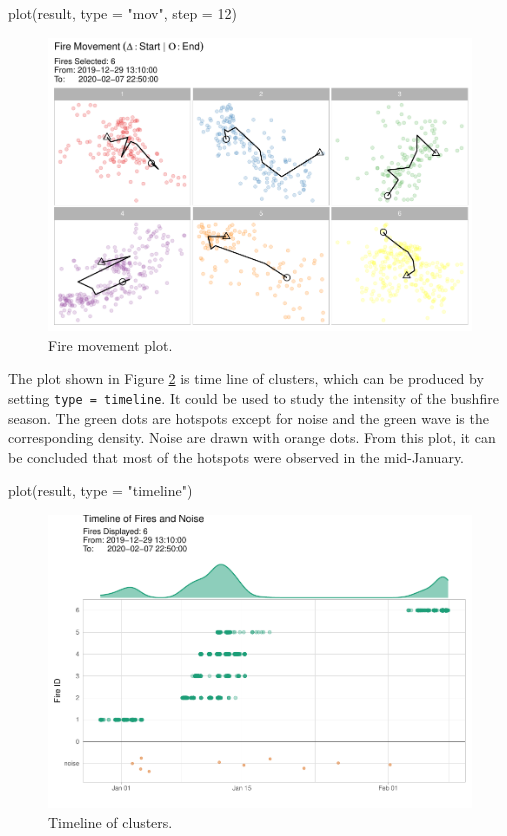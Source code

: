 \begin{Schunk}
\begin{Sinput}
plot(result, type = "mov", step = 12)
\end{Sinput}
\begin{figure}

{\centering \includegraphics[width=0.8\linewidth]{clustering_paper_files/figure-latex/demomovplot-1} 

}

\caption[Fire movement plot]{Fire movement plot.}\label{fig:demomovplot}
\end{figure}
\end{Schunk}

The plot shown in Figure \ref{fig:demotimeline} is time line of
clusters, which can be produced by setting
\texttt{type\ =\ \textquotesingle{}timeline\textquotesingle{}}. It could
be used to study the intensity of the bushfire season. The green dots
are hotspots except for noise and the green wave is the corresponding
density. Noise are drawn with orange dots. From this plot, it can be
concluded that most of the hotspots were observed in the mid-January.

\begin{Schunk}
\begin{Sinput}
plot(result, type = "timeline")
\end{Sinput}
\begin{figure}

{\centering \includegraphics[width=0.8\linewidth]{clustering_paper_files/figure-latex/demotimeline-1} 

}

\caption[Timeline of clusters]{Timeline of clusters.}\label{fig:demotimeline}
\end{figure}
\end{Schunk}

